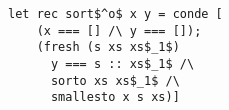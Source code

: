 \begin{figure}[h]
  \centering
  \begin{minipage}{0.87\columnwidth}
    \begin{lstlisting}[frame=tb]
 let rec sort$^o$ x y = conde [
    (x === [] /\ y === []);
    (fresh (s xs xs$_1$)
      y === s :: xs$_1$ /\
      sorto xs xs$_1$ /\
      smallesto x s xs)]
    \end{lstlisting}
  \end{minipage}
\end{figure}
